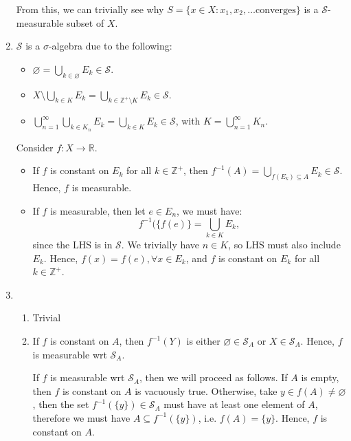 \begin{enumerate}[label=\textbf{2B.\arabic*}]
  From this, we can trivially see why \( S = \{x \in X: x_{1},x_{2}, \ldots
  \text{converges}\}   \) is a \( \mathcal{S} \)-measurable subset of \( X \).
\item \( \mathcal{S} \) is a \( \sigma \)-algebra due to the following:
  \begin{itemize}
  \item \( \varnothing = \bigcup_{k \in \varnothing} E_{k} \in \mathcal{S} \).
  \item \( X \setminus \bigcup_{k \in K} E_{k} = \bigcup_{k \in \mathbb{Z}^{+}
    \setminus K} E_{k} \in \mathcal{S} \).
  \item \( \bigcup_{n=1}^{\infty} \bigcup_{k\in K_{n}} E_{k} = \bigcup_{k \in K}
    E_{k} \in \mathcal{S}\), with \( K = \bigcup_{n =1}^{\infty} K_{n} \).
  \end{itemize}

  Consider \( f: X \to  \mathbb{R} \).
  \begin{itemize}
  \item If \( f \) is constant on \( E_{k} \) for all \( k \in \mathbb{Z}^{+}
    \), then \( f^{-1}(A) = \bigcup_{f(E_{k}) \subseteq A} E_{k} \in \mathcal{S}
    \). Hence, \( f \) is measurable.
  \item If \( f \) is measurable, then let \( e \in E_{n} \), we must have:
    \[
      f^{-1}(\{f(e)\} = \bigcup_{k \in K} E_{k}  
    ,\] since the LHS is in \( \mathcal{S} \). We trivially have \( n \in K \),
    so LHS must also include \( E_{k} \). Hence, \( f(x) = f(e), \forall x \in
    E_{k} \), and \( f \) is constant on \( E_{k} \) for all \( k \in
    \mathbb{Z}^{+} \).
  \end{itemize}

\item
  \begin{enumerate}[label=(\alph*)]
    \item Trivial
    \item If \( f \) is constant on \( A \), then \( f^{-1}(Y) \) is either \(
      \varnothing \in \mathcal{S}_{A} \) or \( X \in \mathcal{S}_{A} \). Hence,
      \( f \) is measurable wrt \( \mathcal{S}_{A} \).

      If \( f \) is measurable wrt \( \mathcal{S}_{A} \), then we will proceed
      as follows. If \( A \) is empty, then \( f \) is constant on \( A \) is
      vacuously true. Otherwise, take \( y \in f(A) \neq  \varnothing \), then
      the set \( f^{-1}(\{y\}  ) \in \mathcal{S}_{A} \) must have at least one
      element of \( A \), therefore we must have \( A \subseteq f^{-1}(\{y\}  )
      \), i.e. \( f(A) = \{y\}   \). Hence, \( f \) is constant on \( A \).
  \end{enumerate}


\end{enumerate}
